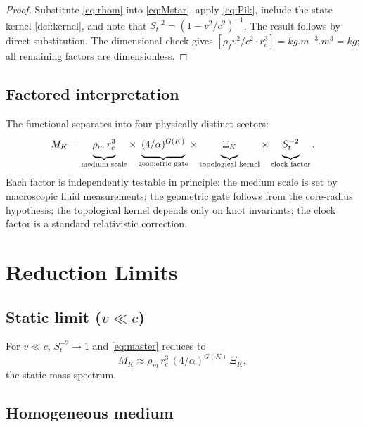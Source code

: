 \documentclass[11pt, a4paper]{article}
\newcommand{\rc}{r_c}        %
\newcommand{\rhof}{\rho_f}   %
\newcommand{\rhom}{\rho_m}   %
\newcommand{\Stv}{S_t}       %
\begin{document}
\begin{proof}
Substitute \cref{eq:rhom} into \cref{eq:Mstar}, apply
\cref{eq:Pik}, include the state kernel \cref{def:kernel},
and note that $\Stv^{-2} = (1-v^2/c^2)^{-1}$.
The result follows by direct substitution.
The dimensional check gives
$[\rhof v^2/c^2\cdot r_c^3] = \si{kg.m^{-3}.m^3} = \si{kg}$;
all remaining factors are dimensionless.
\end{proof}

\subsection{Factored interpretation}
\label{sec:factors}

The functional separates into four physically distinct sectors:
\begin{equation}
  M_K
  = \underbrace{\vphantom{\Big|}\rhom\,\rc^3}_{\text{medium scale}}
    \times
    \underbrace{\vphantom{\Big|}(4/\alpha)^{G(K)}}_{\text{geometric gate}}
    \times
    \underbrace{\vphantom{\Big|}\Xi_K}_{\text{topological kernel}}
    \times
    \underbrace{\vphantom{\Big|}\Stv^{-2}}_{\text{clock factor}}.
  \label{eq:factored}
\end{equation}
Each factor is independently testable in principle:
the medium scale is set by macroscopic fluid measurements;
the geometric gate follows from the core-radius hypothesis;
the topological kernel depends only on knot invariants;
the clock factor is a standard relativistic correction.

\section{Reduction Limits}
\label{sec:limits}

\subsection{Static limit ($v \ll c$)}

For $v \ll c$, $\Stv^{-2} \to 1$ and \cref{eq:master} reduces to
\begin{equation}
  M_K \approx \rhom\,\rc^3\,(4/\alpha)^{G(K)}\,\Xi_K,
\end{equation}
the static mass spectrum.

\subsection{Homogeneous medium}
\end{document}
